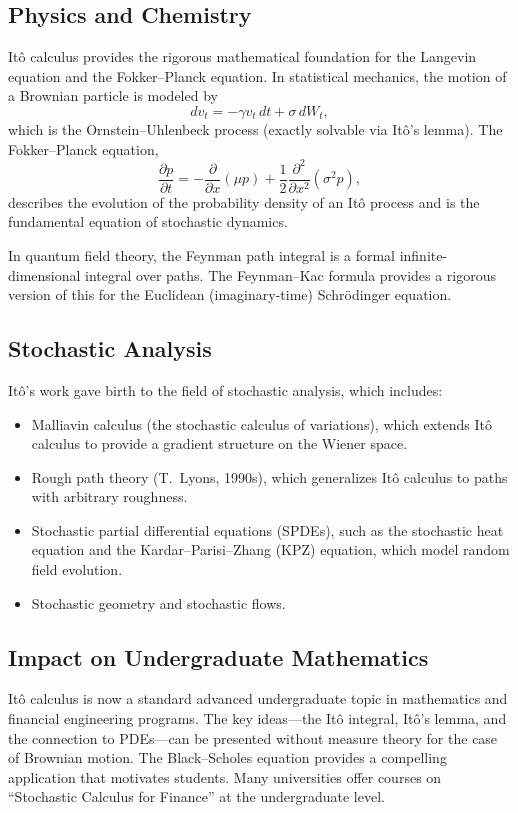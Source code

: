 \subsection{Physics and Chemistry}

It\^{o} calculus provides the rigorous mathematical foundation for the Langevin equation and the Fokker--Planck equation. In statistical mechanics, the motion of a Brownian particle is modeled by
\[
dv_t = -\gamma v_t\,dt + \sigma\,dW_t,
\]
which is the Ornstein--Uhlenbeck process (exactly solvable via It\^{o}'s lemma). The Fokker--Planck equation,
\[
\frac{\partial p}{\partial t} = -\frac{\partial}{\partial x}(\mu p) + \frac12 \frac{\partial^2}{\partial x^2}(\sigma^2 p),
\]
describes the evolution of the probability density of an It\^{o} process and is the fundamental equation of stochastic dynamics.

In quantum field theory, the Feynman path integral is a formal infinite-dimensional integral over paths. The Feynman--Kac formula provides a rigorous version of this for the Euclidean (imaginary-time) Schrödinger equation.

\subsection{Stochastic Analysis}

It\^{o}'s work gave birth to the field of stochastic analysis, which includes:
\begin{itemize}
    \item Malliavin calculus (the stochastic calculus of variations), which extends It\^{o} calculus to provide a gradient structure on the Wiener space.
    \item Rough path theory (T.\ Lyons, 1990s), which generalizes It\^{o} calculus to paths with arbitrary roughness.
    \item Stochastic partial differential equations (SPDEs), such as the stochastic heat equation and the Kardar--Parisi--Zhang (KPZ) equation, which model random field evolution.
    \item Stochastic geometry and stochastic flows.
\end{itemize}

\subsection{Impact on Undergraduate Mathematics}

It\^{o} calculus is now a standard advanced undergraduate topic in mathematics and financial engineering programs. The key ideas---the It\^{o} integral, It\^{o}'s lemma, and the connection to PDEs---can be presented without measure theory for the case of Brownian motion. The Black--Scholes equation provides a compelling application that motivates students. Many universities offer courses on ``Stochastic Calculus for Finance'' at the undergraduate level.

